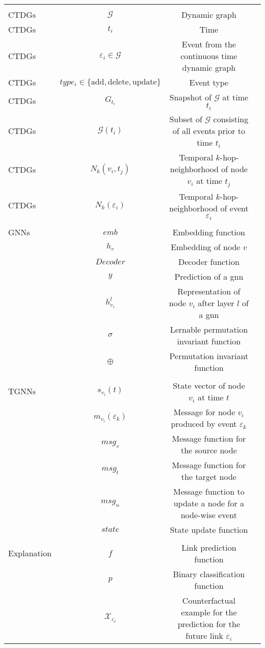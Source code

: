 \begin{table}
\begin{tabular}{lccl}
 & & &\\
 CTDGs& $\mathcal{G}$& Dynamic graph&\\
 CTDGs& $t_i$& Time&\\
 CTDGs& $\varepsilon_i \in \mathcal{G}$& Event from the continuous time dynamic graph&\\
 CTDGs& $type_i \in \{ \mathrm{add, delete, update}\}$& Event type&\\
 CTDGs& $G_{t_i}$& Snapshot of $\mathcal{G}$ at time $t_i$&\\
 CTDGs& $\mathcal{G}(t_i)$& Subset of $\mathcal{G}$ consisting of all events prior to time $t_i$&\\
 CTDGs& $N_k(v_i, t_j)$& Temporal $k$-hop-neighborhood of node $v_i$ at time $t_j$&\\
 CTDGs& $N_k(\varepsilon_i)$& Temporal $k$-hop-neighborhood of event $\varepsilon_i$&\\
 & & &\\
 GNNs& $emb$& Embedding function&\\
 & $h_v$& Embedding of node $v$&\\
 & $Decoder$& Decoder function&\\
 & $y$& Prediction of a \gls{gnn}&\\
 & $h_{v_i}^l$& Representation of node $v_i$ after layer $l$ of a \gls{gnn}&\\
 & $\sigma$& Lernable permutation invariant function&\\
 & $\oplus$& Permutation invariant function&\\
 & & &\\
 TGNNs& $s_{v_i}(t)$& State vector of node $v_i$ at time $t$&\\
 & $m_{v_i}(\varepsilon_k)$& Message for node $v_i$ produced by event $\varepsilon_k$&\\
 & $msg_s$& Message function for the source node&\\
 & $msg_t$& Message function for the target node&\\
 & $msg_n$& Message function to update a node for a node-wise event&\\
 & $state$& State update function&\\
 & & &\\
 Explanation& $f$& Link prediction function&\\
 & $p$& Binary classification function&\\
 & $\mathcal{X_{\varepsilon_i}}$& Counterfactual example for the prediction for the future link $\varepsilon_i$&\\

\end{tabular}
\end{table}

